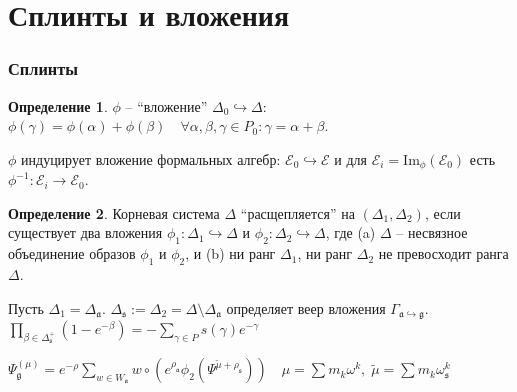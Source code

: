 \documentclass[pdftex]{beamer}
\newcommand{\gf}{\mathfrak{g}}
\newcommand{\af}{\mathfrak{a}}
\newcommand{\sfr}{\mathfrak{s}}
\theoremstyle{definition} \newtheorem{Def}{Определение}
\begin{document}
\section{Сплинты и вложения}
\begin{frame}
  \frametitle{Сплинты}
  \begin{Def}
$\phi $ -- ``вложение'' $\Delta_{0}\hookrightarrow \Delta$:
$\phi (\gamma )=\phi (\alpha )+\phi (\beta )\quad  \forall \alpha ,\beta ,\gamma \in P_{0}: \gamma =\alpha+\beta.$

\end{Def}
$\phi$ индуцирует вложение формальных алгебр: ${\mathcal{E}}_0\hookrightarrow \mathcal{E}$ и  для ${\mathcal{E}}_i=\mathrm{Im}_{\phi}\left( {\mathcal{E}}_0\right)$ есть $\phi^{-1}:{\mathcal{E}}_i \longrightarrow {\mathcal{E}}_0$.

\begin{Def}
Корневая система $\Delta$ ``расщепляется'' на  $(\Delta _{1},\Delta _{2})$, если существует два вложения  $\phi _{1}:\Delta _{1}\hookrightarrow \Delta $ и $\phi _{2}:\Delta _{2}\hookrightarrow \Delta $, где (a) $\Delta $ -- несвязное объединение образов $\phi _{1}$ и $\phi _{2}$, и (b) ни ранг  $\Delta _{1}$, ни ранг  $\Delta _{2}$ не превосходит ранга $\Delta $.
\end{Def}
Пусть $\Delta _{1}=\Delta _{\af}$. $\Delta _{\sfr}:=\Delta_{2}=\Delta \setminus \Delta _{\af}$ определяет  веер вложения  $\Gamma _{\af\hookrightarrow \gf}$. 
$\prod_{\beta \in \Delta _{\sfr}^{+}}\left( 1-e^{-\beta }\right)
=-\sum_{\gamma \in P}s(\gamma )e^{-\gamma }$

$\Psi _{\gf}^{\left( \mu \right) }=e^{-\rho}\sum_{w\in W_{\af}}w\circ \left(
e^{\rho _{\af}}\phi_{2}\left(\Psi ^{\widetilde{\mu }+\rho _{\sfr}}\right)\right) \quad \mu=\sum m_{k}\omega ^{k},\;\widetilde{\mu }=\sum m_{k}\omega _{\sfr}^{k}$

\end{frame}
\end{document}
